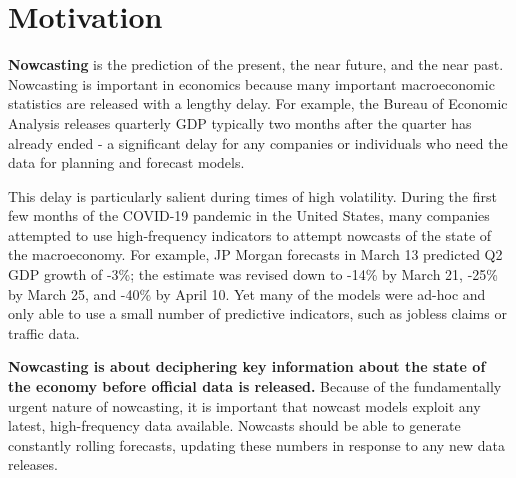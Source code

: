 \documentclass[11pt, letterpaper]{article}
\begin{document}


\section{Motivation}
\textbf{Nowcasting} is the prediction of the present, the near future, and the near past. Nowcasting is important in economics because many important macroeconomic statistics are released with a lengthy delay. For example, the Bureau of Economic Analysis releases quarterly GDP typically two months after the quarter has already ended - a significant delay for any companies or individuals who need the data for planning and forecast models.

This delay is particularly salient during times of high volatility. During the first few months of the COVID-19 pandemic in the United States, many companies attempted to use high-frequency indicators to attempt nowcasts of the state of the macroeconomy. For example, JP Morgan forecasts in March 13 predicted Q2 GDP growth of -3\%; the estimate was revised down to -14\% by March 21, -25\% by March 25, and -40\% by April 10. Yet many of the models were ad-hoc and only able to use a small number of predictive indicators, such as jobless claims or traffic data.

\textbf{Nowcasting is about deciphering key information about the state of the economy before official data is released.} Because of the fundamentally urgent nature of nowcasting, it is important that nowcast models exploit any latest, high-frequency data available. Nowcasts should be able to generate constantly rolling forecasts, updating these numbers in response to any new data releases.
\end{document}
